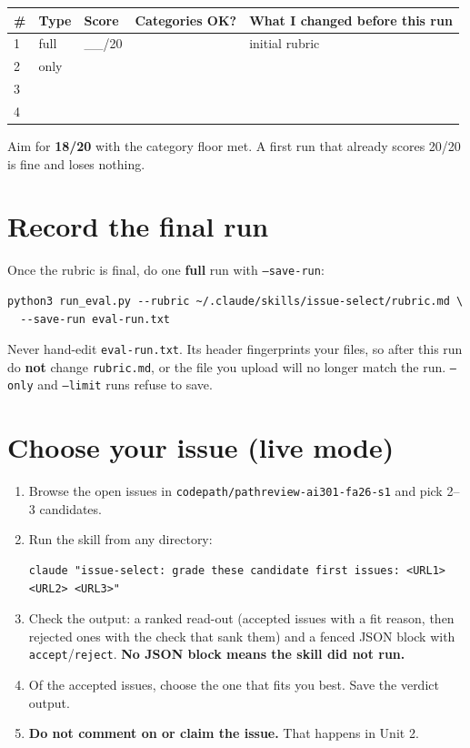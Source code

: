 \documentclass[11pt]{article}
\begin{document}
\begin{center}
\small
\begin{tabular}{@{}llllp{5.5cm}@{}}
\toprule
\textbf{\#} & \textbf{Type} & \textbf{Score} & \textbf{Categories OK?} & \textbf{What I changed before this run} \\
\midrule
1 & full & \_\_/20 & & initial rubric \\
2 & only & & & \\
3 & & & & \\
4 & & & & \\
\bottomrule
\end{tabular}
\end{center}

\begin{notebox}
Aim for \textbf{18/20} with the category floor met. A first run that already scores 20/20 is fine and loses nothing.
\end{notebox}

\section{Record the final run}
Once the rubric is final, do one \textbf{full} run with \texttt{--save-run}:
\begin{lstlisting}
python3 run_eval.py --rubric ~/.claude/skills/issue-select/rubric.md \
  --save-run eval-run.txt
\end{lstlisting}
\begin{warnbox}
Never hand-edit \texttt{eval-run.txt}. Its header fingerprints your files, so after this run do \textbf{not}
change \texttt{rubric.md}, or the file you upload will no longer match the run. \texttt{--only} and
\texttt{--limit} runs refuse to save.
\end{warnbox}

\section{Choose your issue (live mode)}
\begin{enumerate}[label=\textbf{7.\arabic*}]
  \item Browse the open issues in \texttt{codepath/pathreview-ai301-fa26-s1} and pick 2--3 candidates.
  \item Run the skill from any directory:
\begin{lstlisting}
claude "issue-select: grade these candidate first issues: <URL1> <URL2> <URL3>"
\end{lstlisting}
  \item Check the output: a ranked read-out (accepted issues with a fit reason, then rejected ones with the check that sank them)
        and a fenced JSON block with \texttt{accept}/\texttt{reject}. \textbf{No JSON block means the skill did not run.}
  \item Of the accepted issues, choose the one that fits you best. Save the verdict output.
  \item \textbf{Do not comment on or claim the issue.} That happens in Unit 2.
\end{enumerate}
\end{document}
